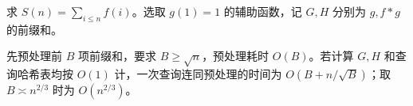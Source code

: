 求 $S(n)=\sum_{i\le n}f(i)$。选取 $g(1)=1$ 的辅助函数，记 $G,H$ 分别为 $g,f*g$ 的前缀和。

先预处理前 $B$ 项前缀和，要求 $B\ge\sqrt n$，预处理耗时 $O(B)$。若计算 $G,H$ 和查询哈希表均按 $O(1)$ 计，一次查询连同预处理的时间为 $O(B+n/\sqrt B)$；取 $B\asymp n^{2/3}$ 时为 $O(n^{2/3})$。
